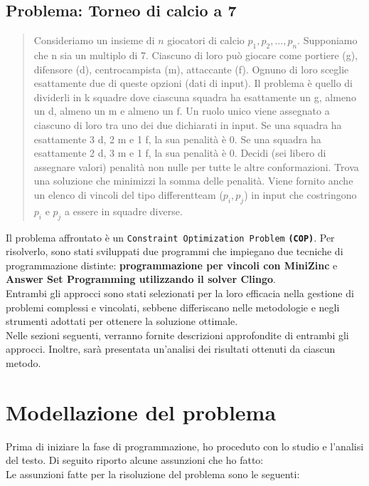 \documentclass{article}
\begin{document}
\begin{multicols*}{2}
\subsection{Problema: Torneo di calcio a 7}
\begin{quote}
    Consideriamo un insieme di \( n \) giocatori di calcio \( p_1, p_2, \ldots, p_n \).
    Supponiamo che n sia un multiplo di 7. 
    Ciascuno di loro può giocare come portiere (g), difensore (d), centrocampista (m), attaccante (f). 
    Ognuno di loro sceglie esattamente due di queste opzioni (dati di input).
    Il problema è quello di dividerli in k squadre dove ciascuna squadra ha esattamente un g, almeno un d, almeno un m e almeno un f. Un ruolo unico viene assegnato a ciascuno di loro tra uno dei due dichiarati in input.
    Se una squadra ha esattamente 3 d, 2 m e 1 f, la sua penalità è 0. Se una squadra ha esattamente 2 d, 3 m e 1 f, la sua penalità è 0. Decidi (sei libero di assegnare valori) penalità non nulle per tutte le altre conformazioni.
    Trova una soluzione che minimizzi la somma delle penalità.
    Viene fornito anche un elenco di vincoli del tipo differentteam (\( p_i, p_j\)) 
    in input che costringono \(p_i\) e \(p_j\) a essere in squadre diverse. 
\end{quote}
Il problema affrontato è un \texttt{Constraint Optimization Problem} \textbf{\texttt{(COP)}}. 
Per risolverlo, sono stati sviluppati due programmi che impiegano due tecniche di programmazione distinte:
 \textbf{programmazione per vincoli con MiniZinc} e \textbf{Answer Set Programming utilizzando il solver Clingo}.
\\
Entrambi gli approcci sono stati selezionati per la loro efficacia nella gestione di problemi complessi e vincolati, 
sebbene differiscano nelle metodologie e negli strumenti adottati per ottenere la soluzione ottimale. 
\\
Nelle sezioni seguenti, verranno fornite descrizioni approfondite di entrambi gli approcci.
Inoltre, sarà presentata un'analisi dei risultati ottenuti da ciascun metodo. 

\section{Modellazione del problema}
Prima di iniziare la fase di programmazione, ho proceduto con lo studio e l'analisi del testo. 
Di seguito riporto alcune assunzioni che ho fatto:
\\
Le assunzioni fatte per la risoluzione del problema sono le seguenti:


\end{multicols*}
\end{document}
